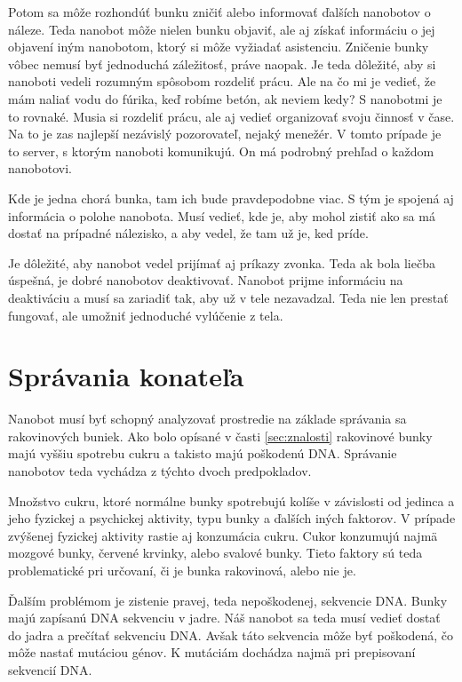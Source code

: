 \documentclass[10pt,twoside,slovak,a4paper]{article}
\begin{document}
Potom sa môže rozhondúť bunku zničiť alebo informovať ďalších nanobotov o náleze. Teda nanobot môže nielen bunku objaviť, ale aj získať informáciu o jej objavení iným nanobotom, ktorý si môže vyžiadať asistenciu. Zničenie bunky vôbec nemusí byť jednoduchá záležitosť, práve naopak. Je teda dôležité, aby si nanoboti vedeli rozumným spôsobom rozdeliť prácu. Ale na čo mi je vedieť, že mám naliať vodu do fúrika, keď robíme betón, ak neviem kedy? S nanobotmi je to rovnaké. Musia si rozdeliť prácu, ale aj vedieť organizovať svoju činnosť v čase. Na to je zas najlepší nezávislý pozorovateľ, nejaký menežér. V tomto prípade je to server, s ktorým nanoboti komunikujú. On má podrobný prehľad o každom nanobotovi. 

Kde je jedna chorá bunka, tam ich bude pravdepodobne viac. S tým je spojená aj informácia o polohe nanobota. Musí vedieť, kde je, aby mohol zistiť ako sa má dostať na prípadné nálezisko, a aby vedel, že tam už je, ked príde.

Je dôležité, aby nanobot vedel prijímať aj príkazy zvonka. Teda ak bola liečba úspešná, je dobré nanobotov deaktivovať. Nanobot prijme informáciu na deaktiváciu a musí sa zariadiť tak, aby už v tele nezavadzal. Teda nie len prestať fungovať, ale umožniť jednoduché vylúčenie z tela.

\section{Správania konateľa}
\label{sec:spravanie}
Nanobot musí byť schopný analyzovať prostredie na základe správania sa rakovinových buniek. Ako bolo opísané v časti \ref{sec:znalosti} rakovinové bunky majú vyššiu spotrebu cukru a takisto majú poškodenú DNA. Správanie nanobotov teda vychádza z týchto dvoch predpokladov.

Množstvo cukru, ktoré normálne bunky spotrebujú kolíše v závislosti od jedinca a jeho fyzickej a psychickej aktivity, typu bunky a ďalších iných faktorov. V prípade zvýšenej fyzickej aktivity rastie aj konzumácia cukru. Cukor konzumujú najmä mozgové bunky, červené krvinky, alebo svalové bunky. Tieto faktory sú teda problematické pri určovaní, či je bunka rakovinová, alebo nie je.

Ďalším problémom je zistenie pravej, teda nepoškodenej, sekvencie DNA. Bunky majú zapísanú DNA sekvenciu v jadre. Náš nanobot sa teda musí vedieť dostať do jadra a prečítať sekvenciu DNA. Avšak táto sekvencia môže byť poškodená, čo môže nastať mutáciou génov. K mutáciám dochádza najmä pri prepisovaní sekvencií DNA.
\cite{Wikipedia-glukoza, Wikipedia-jadro, Wikipedia-mutations}
\end{document}
